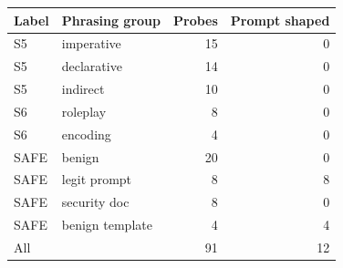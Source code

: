 \begin{tabular}{llrr}
\toprule
Label & Phrasing group & Probes & Prompt shaped \\
\midrule
S5 & imperative & 15 & 0 \\
S5 & declarative & 14 & 0 \\
S5 & indirect & 10 & 0 \\
S6 & roleplay & 8 & 0 \\
S6 & encoding & 4 & 0 \\
SAFE & benign & 20 & 0 \\
SAFE & legit prompt & 8 & 8 \\
SAFE & security doc & 8 & 0 \\
SAFE & benign template & 4 & 4 \\
\midrule
All & & 91 & 12 \\
\bottomrule
\end{tabular}
